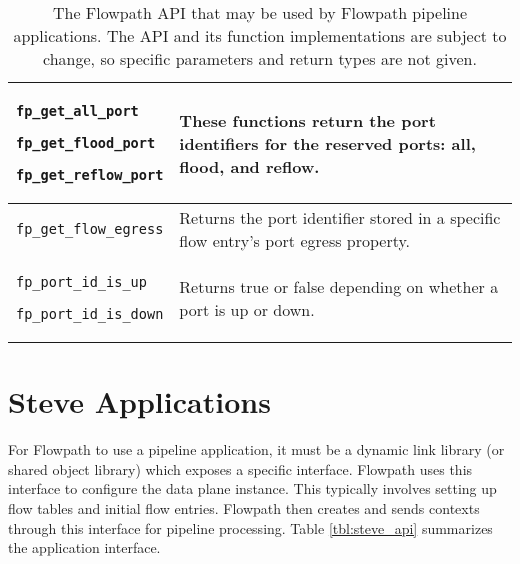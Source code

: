 \begin{table}
\begin{center}
\begin{tabular}{| p{0.3\linewidth} | p{0.7\linewidth} |}

\texttt{fp\_get\_all\_port}

\texttt{fp\_get\_flood\_port}

\texttt{fp\_get\_reflow\_port} &

These functions return the port identifiers for the reserved ports: all, flood, and reflow. \\

\hline


\texttt{fp\_get\_flow\_egress} & Returns the port identifier stored in a specific flow entry's port egress property. \\

\hline


\texttt{fp\_port\_id\_is\_up}

\texttt{fp\_port\_id\_is\_down} &

Returns true or false depending on whether a port is up or down. \\

\hline

\end{tabular}
\end{center}
\caption{The Flowpath API that may be used by Flowpath pipeline applications. The API and its function implementations are subject to change, so specific parameters and return types are not given.}
\label{tbl:flowpath_api}
\end{table}

\section{Steve Applications} \label{fp:app_interface}

For Flowpath to use a pipeline application, it must be a dynamic link library (or shared object library) which exposes a specific interface. Flowpath uses this interface to configure the data plane instance. This typically involves setting up flow tables and initial flow entries. Flowpath then creates and sends contexts through this interface for pipeline processing. Table \ref{tbl:steve_api} summarizes the application interface.

